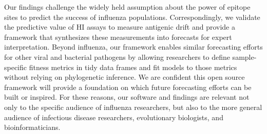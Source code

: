 \documentclass[stdletter,letterpaper,addrfromright,orderfromdateto,dateleft,11pt,noaddrto,sigleft]{newlfm}
\begin{document}
\begin{newlfm}
  Our findings challenge the widely held assumption about the power of epitope sites to predict the success of influenza populations.
  Correspondingly, we validate the predictive value of HI assays to measure antigenic drift and provide a framework that synthesizes these measurements into forecasts for expert interpretation.
  Beyond influenza, our framework enables similar forecasting efforts for other viral and bacterial pathogens by allowing researchers to define sample-specific fitness metrics in tidy data frames and fit models to those metrics without relying on phylogenetic inference.
  We are confident this open source framework will provide a foundation on which future forecasting efforts can be built or inspired.
  For these reasons, our software and findings are relevant not only to the specific audience of influenza researchers, but also to the more general audience of infectious disease researchers, evolutionary biologists, and bioinformaticians.
\end{newlfm}
\end{document}
